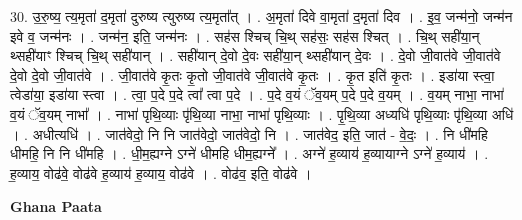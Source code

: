 \documentclass[17pt]{extarticle}
\begin{document}
30. उ॒रु॒ष्य॒ त्य॒मृता॑ द॒मृता॑ दुरुष्य त्युरुष्य त्य॒मृता᳚त् । . अ॒मृता॑ दिवे वा॒मृता॑ द॒मृता॑ दिव । . इ॒व॒ जन्म॑नो॒ जन्म॑न इवे व॒ जन्म॑नः । . जन्म॑न॒ इति॒ जन्म॑नः । . सह॑स श्चिच् चि॒थ् सह॑सः॒ सह॑स श्चित् । . चि॒थ् सही॑या॒न् थ्सही॑याꣳ श्चिच् चि॒थ् सही॑यान् । . सही॑यान् दे॒वो दे॒वः सही॑या॒न् थ्सही॑यान् दे॒वः । . दे॒वो जी॒वात॑वे जी॒वात॑वे दे॒वो दे॒वो जी॒वात॑वे । . जी॒वात॑वे कृ॒तः कृ॒तो जी॒वात॑वे जी॒वात॑वे कृ॒तः । . कृ॒त इति॑ कृ॒तः । . इडा॑या स्त्वा॒ त्वेडा॑या॒ इडा॑या स्त्वा । . त्वा॒ प॒दे प॒दे त्वा᳚ त्वा प॒दे । . प॒दे व॒यं ॅव॒यम् प॒दे प॒दे व॒यम् । . व॒यम् नाभा॒ नाभा॑ व॒यं ॅव॒यम् नाभा᳚ । . नाभा॑ पृथि॒व्याः पृ॑थि॒व्या नाभा॒ नाभा॑ पृथि॒व्याः । . पृ॒थि॒व्या अध्यधि॑ पृथि॒व्याः पृ॑थि॒व्या अधि॑ । . अधीत्यधि॑ । . जात॑वेदो॒ नि नि जात॑वेदो॒ जात॑वेदो॒ नि । . जात॑वेद॒ इति॒ जात॑ - वे॒दः॒ । . नि धी॑महि धीमहि॒ नि नि धी॑महि । . धी॒म॒ह्यग्ने ऽग्ने॑ धीमहि धीम॒ह्यग्ने᳚ । . अग्ने॑ ह॒व्याय॑ ह॒व्यायाग्ने ऽग्ने॑ ह॒व्याय॑ । . ह॒व्याय॒ वोढ॑वे॒ वोढ॑वे ह॒व्याय॑ ह॒व्याय॒ वोढ॑वे । . वोढ॑व॒ इति॒ वोढ॑वे । \newline

\textbf{Ghana Paata } \newline
\end{document}
